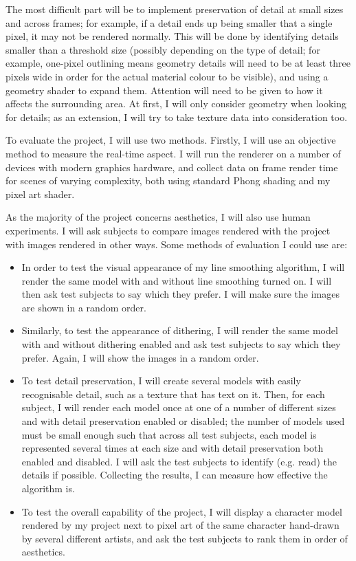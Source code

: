 \documentclass[12pt,twoside,notitlepage]{report}
\begin{document}
The most difficult part will be to implement preservation of detail at small sizes and across frames; for example, if a detail ends up being smaller that a single pixel, it may not be rendered normally. This will be done by identifying details smaller than a threshold size (possibly depending on the type of detail; for example, one-pixel outlining means geometry details will need to be at least three pixels wide in order for the actual material colour to be visible), and using a geometry shader to expand them. Attention will need to be given to how it affects the surrounding area. At first, I will only consider geometry when looking for details; as an extension, I will try to take texture data into consideration too.

To evaluate the project, I will use two methods. Firstly, I will use an objective method to measure the real-time aspect. I will run the renderer on a number of devices with modern graphics hardware, and collect data on frame render time for scenes of varying complexity, both using standard Phong shading and my pixel art shader.

As the majority of the project concerns aesthetics, I will also use human experiments. I will ask subjects to compare images rendered with the project with images rendered in other ways. Some methods of evaluation I could use are:

\begin{itemize}

\item In order to test the visual appearance of my line smoothing algorithm, I will render the same model with and without line smoothing turned on. I will then ask test subjects to say which they prefer. I will make sure the images are shown in a random order.

\item Similarly, to test the appearance of dithering, I will render the same model with and without dithering enabled and ask test subjects to say which they prefer. Again, I will show the images in a random order.

\item To test detail preservation, I will create several models with easily recognisable detail, such as a texture that has text on it. Then, for each subject, I will render each model once at one of a number of different sizes and with detail preservation enabled or disabled; the number of models used must be small enough such that across all test subjects, each model is represented several times at each size and with detail preservation both enabled and disabled. I will ask the test subjects to identify (e.g. read) the details if possible. Collecting the results, I can measure how effective the algorithm is.

\item To test the overall capability of the project, I will display a character model rendered by my project next to pixel art of the same character hand-drawn by several different artists, and ask the test subjects to rank them in order of aesthetics.

\end{itemize}
\end{document}

